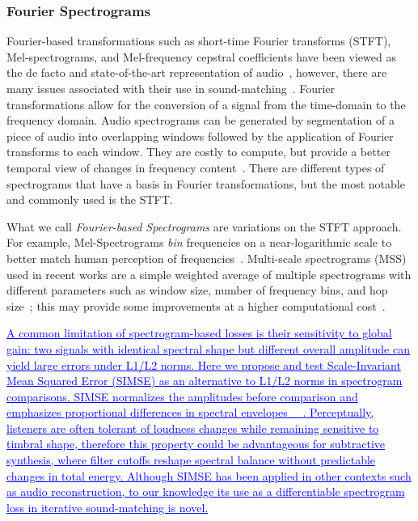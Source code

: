 \documentclass[lettersize,journal]{IEEEtran}
\renewcommand{\DIFadd}[1]{\textcolor{blue}{\uline{#1}}}
\providecommand{\gls}[1]{#1}
\providecommand{\DIFadd}[1]{{\protect\color{blue}\uwave{#1}}} %
\providecommand{\DIFaddbegin}{} %
\providecommand{\DIFdelbegin}{} %
\providecommand{\DIFdelend}{} %
\providecommand{\DIFscaledelfig}{0.5}
\newlength{\DIFdelgraphicswidth} %
\newlength{\DIFdelgraphicsheight} %
\providecommand{\DIFaddincludegraphics}[2][]{{\color{blue}\fbox{\DIFOincludegraphics[#1]{#2}}}} %
\providecommand{\DIFdelincludegraphics}[2][]{%
\sbox{\DIFdelgraphicsbox}{\DIFOincludegraphics[#1]{#2}}%
\settoboxwidth{\DIFdelgraphicswidth}{\DIFdelgraphicsbox} %
\settoboxtotalheight{\DIFdelgraphicsheight}{\DIFdelgraphicsbox} %
\scalebox{\DIFscaledelfig}{%
\parbox[b]{\DIFdelgraphicswidth}{\usebox{\DIFdelgraphicsbox}\\[-\baselineskip] \rule{\DIFdelgraphicswidth}{0em}}\llap{\resizebox{\DIFdelgraphicswidth}{\DIFdelgraphicsheight}{%
\setlength{\unitlength}{\DIFdelgraphicswidth}%
\begin{picture}(1,1)%
\thicklines\linethickness{2pt} %
{\color[rgb]{1,0,0}\put(0,0){\framebox(1,1){}}}%
{\color[rgb]{1,0,0}\put(0,0){\line( 1,1){1}}}%
{\color[rgb]{1,0,0}\put(0,1){\line(1,-1){1}}}%
\end{picture}%
}\hspace*{3pt}}} %
} %
\DeclareRobustCommand{\DIFaddbegin}{\DIFOaddbegin \let\includegraphics\DIFaddincludegraphics} %
\DeclareRobustCommand{\DIFdelbegin}{\DIFOdelbegin \let\includegraphics\DIFdelincludegraphics} %
\DeclareRobustCommand{\DIFdelend}{\DIFOaddend \let\includegraphics\DIFOincludegraphics} %
\begin{document}
\subsubsection{Fourier Spectrograms}
\label{sec:fourier_specs}
Fourier-based transformations such as short-time Fourier transforms (\gls{STFT}), Mel-spectrograms, and Mel-frequency cepstral coefficients have been viewed as the de facto and state-of-the-art representation of audio~\cite{beauchamp2003error,mitchell2007evolutionary,yee2018automatic}, however, there are many issues associated with their use in sound-matching~\cite{turian2020sorry,vahidi2023mesostructures,han2023perceptual,uzrad2024diffmoog}. Fourier transformations allow for the conversion of a signal from the time-domain to the frequency domain. Audio spectrograms can be generated by segmentation of a piece of audio into overlapping windows followed by the application of Fourier transforms to each window. They are costly to compute, but provide a better temporal view of changes in frequency content~\cite{muller2007dynamic,smith2007mathematics}. There are different types of spectrograms that have a basis in Fourier transformations, but the most notable and commonly used is the STFT.  
\DIFdelbegin %

\DIFdelend What we call \textit{Fourier-based Spectrograms} are variations on the STFT approach. For example, Mel-Spectrograms \textit{bin} frequencies on a near-logarithmic scale to better match human perception of frequencies~\cite{muller2007dynamic}. Multi-scale spectrograms (\gls{MSS}) used in recent works are a simple weighted average of multiple spectrograms with different parameters such as window size, number of frequency bins, and hop size~\cite{engel2020ddsp,vahidi2023mesostructures}; this may provide some improvements at a higher computational cost~\cite{turian2020sorry,engel2020ddsp}.

\DIFaddbegin \DIFadd{A common limitation of spectrogram-based losses is their sensitivity to global gain: two signals with identical spectral shape but different overall amplitude can yield large errors under L1/L2 norms. 
Here we propose and test Scale-Invariant Mean Squared Error (SIMSE) as an alternative to L1/L2 norms in spectrogram comparisons. SIMSE normalizes the amplitudes before comparison and emphasizes proportional differences in spectral envelopes~\mbox{%
\cite{barron2014shapessimse}}\hskip0pt%
. 
Perceptually, listeners are often tolerant of loudness changes while remaining sensitive to timbral shape, therefore this property could be advantageous for subtractive synthesis, where filter cutoffs reshape spectral balance without predictable changes in total energy. Although SIMSE has been applied in other contexts such as audio reconstruction, to our knowledge its use as a differentiable spectrogram loss in iterative sound-matching is novel.
}
\end{document}
